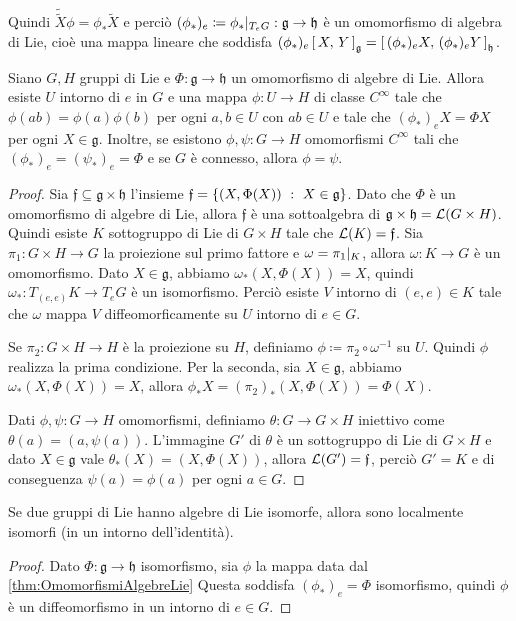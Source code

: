 Quindi $\tilde{\tilde X} \phi = \phi_*\tilde X$ e perciò $(\phi_*)_e\coloneqq \phi_*|_{T_eG}:\mathfrak g \to \mathfrak h$ è un omomorfismo di algebra di Lie, cioè una mappa lineare che soddisfa $(\phi_*)_e \left[\,X,\,Y\,\right] _{\mathfrak g} = \left[\, (\phi_*)_eX,\, (\phi_*)_eY \,\right]_{\mathfrak h}$.

\begin{theorem}\label{thm:OmomorfismiAlgebreLie}
	Siano $G,H$ gruppi di Lie e $\Phi: \mathfrak g \to \mathfrak h$ un omomorfismo di algebre di Lie. Allora esiste $U$ intorno di $e$ in $G$ e una mappa $\phi: U \to H$ di classe $C^\infty$ tale che $\phi(ab) = \phi(a) \phi(b)$ per ogni $a,b \in U$ con $ab \in U$ e tale che $(\phi_*)_e X = \Phi X$ per ogni $X\in\mathfrak g$.
	Inoltre, se esistono $\phi,\psi : G \to H$ omomorfismi $C^\infty$ tali che $(\phi_*)_e = (\psi_*)_e = \Phi$ e se $G$ è connesso, allora $\phi = \psi$.
\end{theorem}
\begin{proof}
	Sia $\mathfrak f \subseteq \mathfrak g \times \mathfrak h$ l'insieme $\mathfrak f = \{ (X,\Phi(X)) \ :\  X \in \mathfrak g \}$.
	Dato che $\Phi$ è un omomorfismo di algebre di Lie, allora $\mathfrak f$ è una sottoalgebra di $\mathfrak g \times \mathfrak h = \mathcal L(G\times H)$.
	Quindi esiste $K$ sottogruppo di Lie di $G\times H$ tale che $\mathcal L(K) = \mathfrak f$.
	Sia $\pi_1:G\times H \to G$ la proiezione sul primo fattore e $\omega = \pi_1|_ K$, allora $\omega: K \to G$ è un omomorfismo.
	Dato $X\in \mathfrak g$, abbiamo $\omega_*(X,\Phi(X)) = X$, quindi $\omega_*:T_{(e,e)}K\to T_e G$ è un isomorfismo.
	Perciò esiste $V$ intorno di $(e,e) \in K$ tale che $\omega$ mappa $V$ diffeomorficamente su $U$ intorno di $e\in G$.
	
	Se $\pi_2 : G\times H \to H$ è la proiezione su $H$, definiamo $\phi \coloneqq \pi_2 \circ \omega^{-1}$ su $U$. Quindi $\phi$ realizza la prima condizione. Per la seconda, sia $X\in\mathfrak g$, abbiamo $\omega_*(X,\Phi(X)) = X$, allora $\phi_*X = (\pi_2)_*(X,\Phi(X)) =\Phi(X)$.
	
	Dati $\phi,\psi:G\to H$ omomorfismi, definiamo $\theta:G \to G\times H$ iniettivo come $\theta(a) = (a,\psi(a))$. L'immagine $G'$ di $\theta$ è un sottogruppo di Lie di $G\times H$ e dato $X \in \mathfrak g$ vale $\theta_*(X) = (X,\Phi(X))$, allora $\mathcal L(G') = \mathfrak f$, perciò $G'=K$ e di conseguenza $\psi(a) = \phi(a)$ per ogni $a \in G$. 
\end{proof}



\begin{corollary} \label{cor:AlgebreIsomorfeLocIsomorfi}
	Se due gruppi di Lie hanno algebre di Lie isomorfe, allora sono localmente isomorfi (in un intorno dell'identità).
\end{corollary}
\begin{proof}
	Dato $\Phi: \mathfrak g \to \mathfrak h$ isomorfismo, sia $\phi$ la mappa data dal \cref{thm:OmomorfismiAlgebreLie}
	Questa soddisfa $(\phi_*)_e = \Phi$ isomorfismo, quindi $\phi$ è un diffeomorfismo in un intorno di $e \in G$.
\end{proof}



